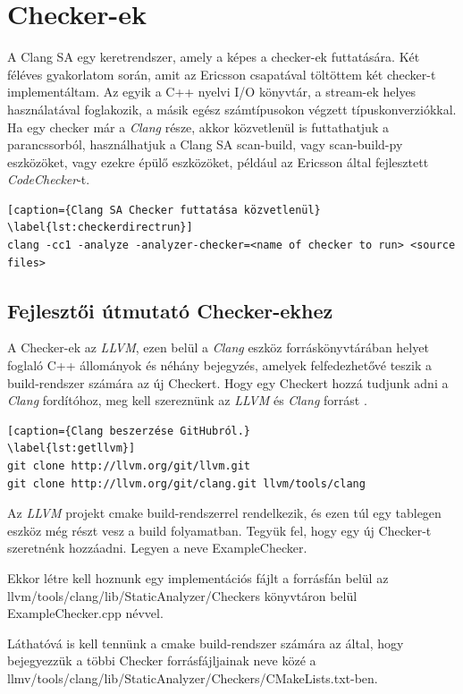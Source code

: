 \documentclass[a4paper,12pt]{report}
\begin{document}
\chapter{Checker-ek}
A Clang SA egy keretrendszer, amely a képes a checker-ek futtatására. Két féléves gyakorlatom során, amit az Ericsson csapatával töltöttem két checker-t implementáltam. Az egyik a C++ nyelvi I/O könyvtár, a stream-ek helyes használatával foglakozik, a másik egész számtípusokon végzett típuskonverziókkal.
Ha egy checker már a \emph{Clang} része, akkor közvetlenül is futtathatjuk a parancssorból, használhatjuk a Clang SA scan-build, vagy scan-build-py eszközöket, vagy ezekre épülő eszközöket, például az Ericsson által fejlesztett \emph{CodeChecker}-t.

\begin{lstlisting}[caption={Clang SA Checker futtatása közvetlenül}
\label{lst:checkerdirectrun}]
clang -cc1 -analyze -analyzer-checker=<name of checker to run> <source files>
\end{lstlisting}

\section{Fejlesztői útmutató Checker-ekhez}
A Checker-ek az \emph{LLVM}, ezen belül a \emph{Clang} eszköz forráskönyvtárában helyet foglaló C++ állományok és néhány bejegyzés, amelyek felfedezhetővé teszik a build-rendszer számára az új Checkert. Hogy egy Checkert hozzá tudjunk adni a \emph{Clang} fordítóhoz, meg kell szereznünk az \emph{LLVM} és \emph{Clang} forrást \cite{getllvmpage}.

\begin{lstlisting}[caption={Clang beszerzése GitHubról.}
\label{lst:getllvm}]
git clone http://llvm.org/git/llvm.git
git clone http://llvm.org/git/clang.git llvm/tools/clang
\end{lstlisting}

Az \emph{LLVM} projekt cmake build-rendszerrel rendelkezik, és ezen túl egy tablegen eszköz még részt vesz a build folyamatban. Tegyük fel, hogy egy új Checker-t szeretnénk hozzáadni. Legyen a neve ExampleChecker.

Ekkor létre kell hoznunk egy implementációs fájlt a forrásfán belül az llvm/tools/clang/lib/StaticAnalyzer/Checkers könyvtáron belül ExampleChecker.cpp névvel.

Láthatóvá is kell tennünk a cmake build-rendszer számára az által, hogy bejegyezzük a többi Checker forrásfájljainak neve közé a llmv/tools/clang/lib/StaticAnalyzer/Checkers/CMakeLists.txt-ben.
\end{document}
